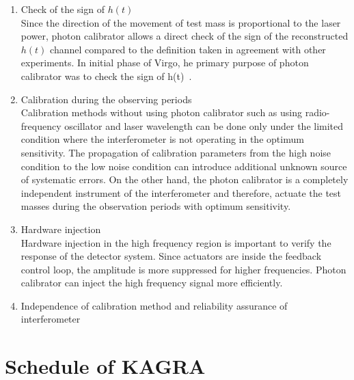 \begin{enumerate}
\item Check of the sign of $h(t)$\\
Since the direction of the movement of test mass is proportional to the 
laser power, photon calibrator allows a direct check of the sign of the 
reconstructed $h(t)$ channel compared to the definition taken in agreement 
with other experiments. In initial phase of Virgo, he primary purpose of 
photon calibrator was to check the sign of h(t)~\cite{VIR-018}.

\item Calibration during the observing periods\\
Calibration methods without using photon calibrator such as using 
radio-frequency oscillator and laser wavelength can be done only under the 
limited condition where the interferometer is not operating in the optimum 
sensitivity. The propagation of calibration parameters from the high noise 
condition to the low noise condition can introduce additional unknown source 
of systematic errors. On the other hand, the photon calibrator is a completely 
independent instrument of the interferometer and therefore, actuate 
the test masses during the observation periods with optimum sensitivity. 

\item Hardware injection\\
Hardware injection in the high frequency region is important to verify the 
response of the detector system. Since actuators are inside the feedback 
control loop, the amplitude is more suppressed for higher frequencies. 
Photon calibrator can inject the high frequency signal more efficiently. 

\item Independence of calibration method
      and reliability assurance of interferometer\\

\end{enumerate}




\section{Schedule of KAGRA}



